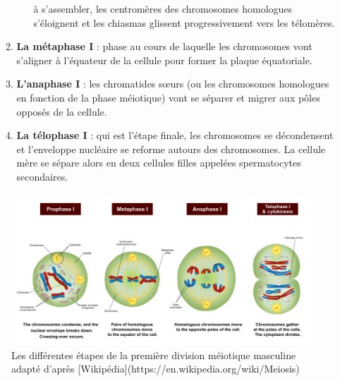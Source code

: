 \documentclass[12pt,twoside]{reedthesis}
\theoremstyle{definition}
\theoremstyle{definition}
\theoremstyle{remark}
\begin{document}
\begin{enumerate}
\begin{enumerate}
\begin{enumerate}
        à s'assembler, les centromères des chromosomes homologues
        s'éloignent et les chiasmas glissent progressivement vers les
        télomères.\\
      \end{enumerate}
    \item
      \textbf{La métaphase I} : phase au cours de laquelle les chromosomes
      vont s'aligner à l'équateur de la cellule pour former la plaque
      équatoriale.
    \item
      \textbf{L'anaphase I} : les chromatides sœurs (ou les chromosomes
      homologues en fonction de la phase méiotique) vont se séparer et
      migrer aux pôles opposés de la cellule.\\
    \item
      \textbf{La télophase I} : qui est l'étape finale, les chromosomes se
      décondensent et l'enveloppe nucléaire se reforme autours des
      chromosomes. La cellule mère se sépare alors en deux cellules filles
      appelées spermatocytes secondaires.
    \end{enumerate}
  \end{enumerate}
  
  \begin{figure}
  
  {\centering \includegraphics[scale=0.43]{figure/MeiosisI} 
  
  }
  
  \caption[Les différentes étapes de la première division méiotique masculine adapté]{Les différentes étapes de la première division méiotique masculine adapté d'après [Wikipédia](https://en.wikipedia.org/wiki/Meiosis)}\label{fig:meiosei}
  \end{figure}
  
\end{document}
